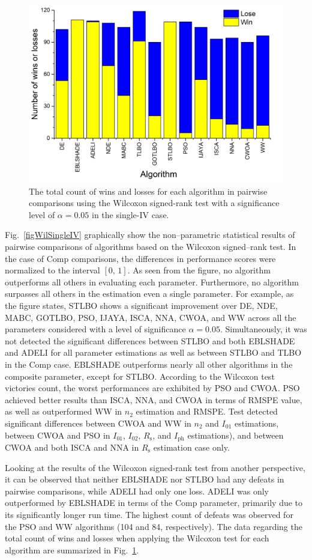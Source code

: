 \documentclass[a4paper,fleqn]{cas-sc}
\begin{document}
\begin{figure}[]
	\centering
		\includegraphics[width=0.45\columnwidth]{Fig5}
	  \caption{The total count of wins and losses for each algorithm in pairwise comparisons using the
               Wilcoxon signed-rank test with a significance level of $\alpha = 0.05$ in the single-IV case.}\label{figWilTotSingleIV}
\end{figure}




Fig.~\ref{figWilSingleIV} graphically show
the non--parametric statistical results of pairwise comparisons of algorithms
based on the Wilcoxon signed--rank test.
In the case of Comp comparisons, the differences in performance scores
were normalized to the interval $[0,\, 1]$.
As seen from the figure, no algorithm outperforms all others in evaluating each parameter.
Furthermore, no algorithm surpasses all others in the estimation even a single parameter.
For example, as the figure states, STLBO shows a significant improvement over
DE, NDE, MABC, GOTLBO, PSO, IJAYA, ISCA, NNA, CWOA, and WW across all the parameters considered
with a level of significance $\alpha = 0.05$.
Simultaneously, it was not detected the significant differences
between STLBO and both EBLSHADE and ADELI for all parameter estimations
as well as between STLBO and TLBO in the Comp case.
EBLSHADE outperforms nearly all other algorithms in the composite parameter, except for STLBO.
According to the Wilcoxon test victories count,
the worst performances are exhibited by PSO and CWOA.
PSO achieved better results than ISCA, NNA, and CWOA in terms of RMSPE value,
as well as outperformed WW in $n_2$ estimation and RMSPE.
Test detected significant differences between CWOA and WW in $n_2$ and $I_{01}$ estimations,
between CWOA and PSO in $I_{01}$, $I_{02}$, $R_\mathrm{s}$, and $I_\mathrm{ph}$ estimations),
and between CWOA and both ISCA and NNA in $R_\mathrm{s}$  estimation case only.


Looking at the results of the Wilcoxon signed-rank test from another perspective,
it can be observed that neither EBLSHADE nor STLBO had any defeats in pairwise comparisons,
while ADELI had only one loss.
ADELI was only outperformed by EBLSHADE in terms of the Comp parameter, primarily due to its significantly longer run time.
The highest count of defeats was observed for the PSO and WW algorithms (104 and 84, respectively).
The data regarding the total count of wins and losses when applying the Wilcoxon test
for each algorithm are summarized in Fig.~\ref{figWilTotSingleIV}.
\end{document}
